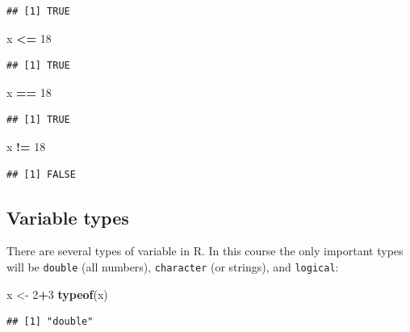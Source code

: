 \documentclass[
]{book}
\newenvironment{Shaded}{\begin{snugshade}}{\end{snugshade}}
\newcommand{\DecValTok}[1]{\textcolor[rgb]{0.00,0.00,0.81}{#1}}
\newcommand{\KeywordTok}[1]{\textcolor[rgb]{0.13,0.29,0.53}{\textbf{#1}}}
\newcommand{\NormalTok}[1]{#1}
\newcommand{\OperatorTok}[1]{\textcolor[rgb]{0.81,0.36,0.00}{\textbf{#1}}}
\newcommand{\StringTok}[1]{\textcolor[rgb]{0.31,0.60,0.02}{#1}}
\begin{document}
\begin{verbatim}
## [1] TRUE
\end{verbatim}

\begin{Shaded}
\begin{Highlighting}[]
\NormalTok{x }\OperatorTok{<=}\StringTok{ }\DecValTok{18}
\end{Highlighting}
\end{Shaded}

\begin{verbatim}
## [1] TRUE
\end{verbatim}

\begin{Shaded}
\begin{Highlighting}[]
\NormalTok{x }\OperatorTok{==}\StringTok{ }\DecValTok{18}
\end{Highlighting}
\end{Shaded}

\begin{verbatim}
## [1] TRUE
\end{verbatim}

\begin{Shaded}
\begin{Highlighting}[]
\NormalTok{x }\OperatorTok{!=}\StringTok{ }\DecValTok{18}
\end{Highlighting}
\end{Shaded}

\begin{verbatim}
## [1] FALSE
\end{verbatim}

\hypertarget{variable-types}{%
\subsection{Variable types}\label{variable-types}}

There are several types of variable in R. In this course the only important types will be \texttt{double} (all numbers), \texttt{character} (or strings), and \texttt{logical}:

\begin{Shaded}
\begin{Highlighting}[]
\NormalTok{x <-}\StringTok{ }\DecValTok{2}\OperatorTok{+}\DecValTok{3}
\KeywordTok{typeof}\NormalTok{(x)}
\end{Highlighting}
\end{Shaded}

\begin{verbatim}
## [1] "double"
\end{verbatim}
\end{document}
